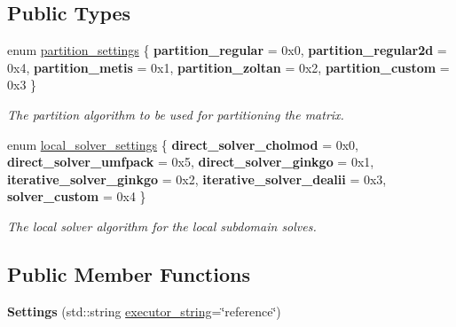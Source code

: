 \subsection*{Public Types}
\begin{DoxyCompactItemize}
\item 
\mbox{\label{structSchwarzWrappers_1_1Settings_a5b3a60043fc866039d760e5357c17f6d}} 
enum \hyperlink{structSchwarzWrappers_1_1Settings_a5b3a60043fc866039d760e5357c17f6d}{partition\+\_\+settings} \{ \newline
{\bfseries partition\+\_\+regular} = 0x0, 
{\bfseries partition\+\_\+regular2d} = 0x4, 
{\bfseries partition\+\_\+metis} = 0x1, 
{\bfseries partition\+\_\+zoltan} = 0x2, 
\newline
{\bfseries partition\+\_\+custom} = 0x3
 \}\begin{DoxyCompactList}\small\item\em The partition algorithm to be used for partitioning the matrix. \end{DoxyCompactList}
\item 
\mbox{\label{structSchwarzWrappers_1_1Settings_abb00a70a7c715c93a2e7570ad6dc1bbe}} 
enum \hyperlink{structSchwarzWrappers_1_1Settings_abb00a70a7c715c93a2e7570ad6dc1bbe}{local\+\_\+solver\+\_\+settings} \{ \newline
{\bfseries direct\+\_\+solver\+\_\+cholmod} = 0x0, 
{\bfseries direct\+\_\+solver\+\_\+umfpack} = 0x5, 
{\bfseries direct\+\_\+solver\+\_\+ginkgo} = 0x1, 
{\bfseries iterative\+\_\+solver\+\_\+ginkgo} = 0x2, 
\newline
{\bfseries iterative\+\_\+solver\+\_\+dealii} = 0x3, 
{\bfseries solver\+\_\+custom} = 0x4
 \}\begin{DoxyCompactList}\small\item\em The local solver algorithm for the local subdomain solves. \end{DoxyCompactList}
\end{DoxyCompactItemize}
\subsection*{Public Member Functions}
\begin{DoxyCompactItemize}
\item 
\mbox{\label{structSchwarzWrappers_1_1Settings_a72edc489ebfe5ad7e8c2bb8424860f2a}} 
{\bfseries Settings} (std\+::string \hyperlink{structSchwarzWrappers_1_1Settings_a737e5de9833ab6f27606103b907ec06e}{executor\+\_\+string}=\char`\"{}reference\char`\"{})
\end{DoxyCompactItemize}

